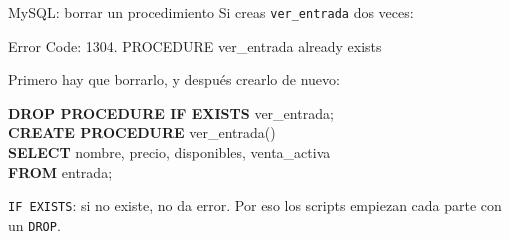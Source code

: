 \documentclass[aspectratio=169,10pt,c]{beamer}
\newcommand{\kw}[1]{\textcolor{utpRojo}{\textbf{#1}}}
\newcommand{\gris}[1]{\textcolor{utpGris}{#1}}
\newcommand{\dentro}[1]{{\setlength{\fboxsep}{1.5pt}\colorbox{yellow!45}{#1}}}
\newenvironment{sqlcode}[1][.86\textwidth]
  {\begin{center}\begin{lrbox}{\sqlbuf}\begin{minipage}{#1}\ttfamily\footnotesize\vspace{6pt}\raggedright}
  {\vspace{6pt}\end{minipage}\end{lrbox}\colorbox{utpGrisClaro}{\usebox{\sqlbuf}}\end{center}}
\newcommand{\errlinea}[1]{{\ttfamily\scriptsize\color{utpRojo}#1}}
\begin{document}
\begin{frame}{MySQL: borrar un procedimiento}
\small Si creas \texttt{ver\_entrada} dos veces:
\vspace{0.1cm}
\begin{center}\errlinea{\footnotesize Error Code: 1304. PROCEDURE ver\_entrada already exists}\end{center}
\vspace{0.2cm}
\small Primero hay que borrarlo, y después crearlo de nuevo:
\begin{sqlcode}[.7\textwidth]
\dentro{\kw{DROP PROCEDURE IF EXISTS} ver\_entrada;}\\[4pt]
\kw{CREATE PROCEDURE} ver\_entrada()\\
\kw{SELECT} nombre, precio, disponibles, venta\_activa\\
\kw{FROM} entrada;
\end{sqlcode}
\vspace{0.1cm}
{\centering\footnotesize\gris{\texttt{IF EXISTS}: si no existe, no da error. Por eso los scripts empiezan cada parte con un \texttt{DROP}.}\par}
\end{frame}
\end{document}

